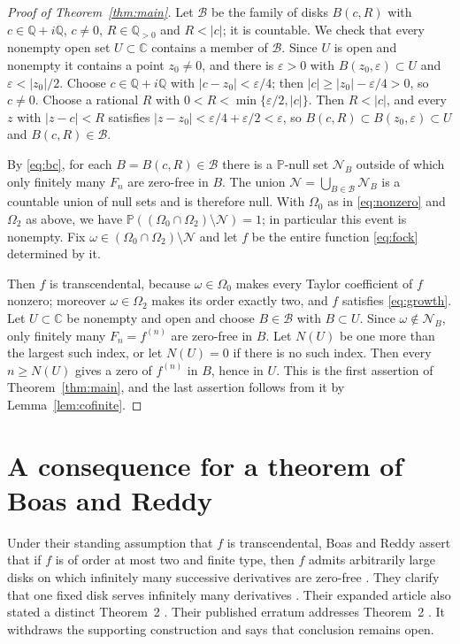 \documentclass[plain]{baustms}
\newcommand{\C}{\mathbb C}
\newcommand{\Q}{\mathbb Q}
\newcommand{\Pp}{\mathbb P}
\theoremstyle{cupthm}
\begin{document}
\begin{proof}[Proof of Theorem~\ref{thm:main}]
Let $\mathcal B$ be the family of disks $B(c,R)$ with $c\in\Q+i\Q$,
$c\neq0$, $R\in\Q_{>0}$ and $R<|c|$; it is countable. We check that every
nonempty open set $U\subset\C$ contains a member of $\mathcal B$. Since $U$
is open and nonempty it contains a point $z_0\neq0$, and there is
$\varepsilon>0$ with $B(z_0,\varepsilon)\subset U$ and
$\varepsilon<|z_0|/2$. Choose $c\in\Q+i\Q$ with $|c-z_0|<\varepsilon/4$;
then $|c|\geq|z_0|-\varepsilon/4>0$, so $c\neq0$. Choose a rational $R$ with
$0<R<\min\{\varepsilon/2,|c|\}$. Then $R<|c|$, and every $z$ with $|z-c|<R$
satisfies $|z-z_0|<\varepsilon/4+\varepsilon/2<\varepsilon$, so
$B(c,R)\subset B(z_0,\varepsilon)\subset U$ and $B(c,R)\in\mathcal B$.

By \eqref{eq:bc}, for each $B=B(c,R)\in\mathcal B$ there is a
$\Pp$-null set $\mathcal N_B$ outside of which only finitely many $F_n$ are
zero-free in $B$. The union $\mathcal N=\bigcup_{B\in\mathcal B}\mathcal N_B$
is a countable union of null sets and is therefore null. With $\Omega_0$ as
in \eqref{eq:nonzero} and $\Omega_2$ as above, we have
$\Pp((\Omega_0\cap\Omega_2)\setminus\mathcal N)=1$; in particular this event
is nonempty. Fix $\omega\in(\Omega_0\cap\Omega_2)\setminus\mathcal N$ and let
$f$ be the entire function \eqref{eq:fock} determined by it.

Then $f$ is transcendental, because $\omega\in\Omega_0$ makes every Taylor
coefficient of $f$ nonzero; moreover $\omega\in\Omega_2$ makes its order
exactly two, and $f$ satisfies \eqref{eq:growth}. Let $U\subset\C$ be
nonempty and open and choose
$B\in\mathcal B$ with $B\subset U$. Since $\omega\notin\mathcal N_B$, only
finitely many $F_n=f^{(n)}$ are zero-free in $B$. Let $N(U)$ be one more than
the largest such index, or let $N(U)=0$ if there is no such index. Then every
$n\geq N(U)$ gives a zero of $f^{(n)}$ in $B$, hence in $U$. This is the first
assertion of Theorem~\ref{thm:main}, and the last assertion follows from it by
Lemma~\ref{lem:cofinite}.
\end{proof}

\section{A consequence for a theorem of Boas and Reddy}
\label{sec:boas-reddy}

Under their standing assumption that $f$ is transcendental, Boas and Reddy
assert that if $f$ is of order at most two and finite type, then $f$ admits
arbitrarily large disks on which infinitely many successive derivatives are
zero-free \cite[Theorem~1]{BoasReddy1973}. They clarify that
one fixed disk serves infinitely many derivatives \cite[p.~65]{BoasReddy1973}.
Their expanded article also stated a distinct Theorem~2
\cite{BoasReddyJMAA1973}.
Their published erratum addresses Theorem~2 \cite{BoasReddy1975}.
It withdraws the supporting construction and says that conclusion remains
open.
\end{document}
